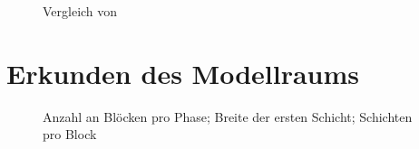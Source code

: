 \begin{figure}
     \centering
     \hfill
     \caption{Vergleich von }
     \label{abb:BaselineMul}
\end{figure}






\section{Erkunden des Modellraums}

 \begin{figure}
     \centering
     \caption{Anzahl an Blöcken pro Phase; Breite der ersten Schicht; Schichten pro Block}
     \hfill
\end{figure}

